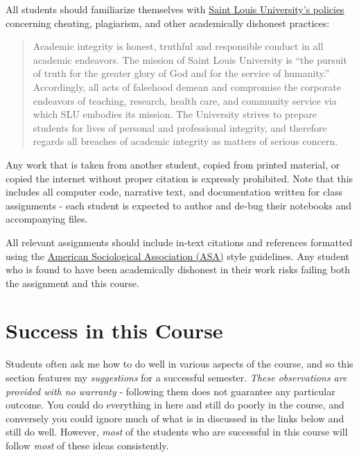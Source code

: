 \documentclass[]{book}
\begin{document}
All students should familiarize themselves with \href{http://www.slu.edu/Documents/provost/academic_affairs/Academic\%20Integrity\%20Policy\%20FINAL\%20\%206-26-15.pd}{Saint Louis University's policies} concerning cheating, plagiarism, and other academically dishonest practices:

\begin{quote}
Academic integrity is honest, truthful and responsible conduct in all academic endeavors. The mission of Saint Louis University is ``the pursuit of truth for the greater glory of God and for the service of humanity.'' Accordingly, all acts of falsehood demean and compromise the corporate endeavors of teaching, research, health care, and community service via which SLU embodies its mission. The University strives to prepare students for lives of personal and professional integrity, and therefore regards all breaches of academic integrity as matters of serious concern.
\end{quote}

Any work that is taken from another student, copied from printed material, or copied the internet without proper citation is expressly prohibited. Note that this includes all computer code, narrative text, and documentation written for class assignments - each student is expected to author and de-bug their notebooks and accompanying files.

All relevant assignments should include in-text citations and references formatted using the \href{https://owl.english.purdue.edu/owl/resource/583/1/}{American Sociological Association (ASA)} style guidelines. Any student who is found to have been academically dishonest in their work risks failing both the assignment and this course.

\hypertarget{success-in-this-course}{%
\chapter{Success in this Course}\label{success-in-this-course}}

Students often ask me how to do well in various aspects of the course, and so this section features my \emph{suggestions} for a successful semester. \emph{These observations are provided with no warranty} - following them does not guarantee any particular outcome. You could do everything in here and still do poorly in the course, and conversely you could ignore much of what is in discussed in the links below and still do well. However, \emph{most} of the students who are successful in this course will follow \emph{most} of these ideas consistently.
\end{document}
